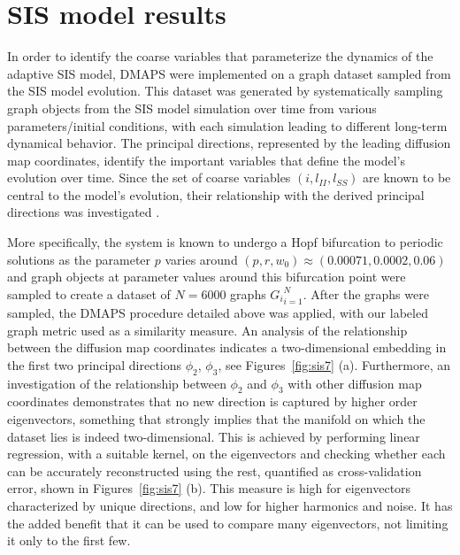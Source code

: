 \section{SIS model results}

In order to identify the coarse variables that parameterize the
dynamics of the adaptive SIS model, DMAPS were implemented on a graph
dataset sampled from the SIS model evolution. This dataset was
generated by systematically sampling graph objects from the SIS model
simulation over time from various parameters/initial conditions, with
each simulation leading to different long-term dynamical behavior. The
principal directions, represented by the leading diffusion map
coordinates, identify the important variables that define the model's
evolution over time. Since the set of coarse variables
$(i, l_{II}, l_{SS})$ are known to be central to the model's
evolution, their relationship with the derived principal directions
was investigated \cite{gross_robust_2008}.

More specifically, the system is known to undergo a Hopf bifurcation
to periodic solutions as the parameter $p$ varies around
$(p, r, w_0) \approx (0.00071, 0.0002, 0.06)$ and graph objects at
parameter values around this bifurcation point were sampled to create
a dataset of $N = 6000$ graphs ${G_i}_{i=1}^N$. After the graphs were
sampled, the DMAPS procedure detailed above was applied, with our
labeled graph metric used as a similarity measure. An analysis of the
relationship between the diffusion map coordinates indicates a
two-dimensional embedding in the first two principal directions
$\phi_2$, $\phi_3$, see Figures~\ref{fig:sis7} (a). Furthermore, an
investigation of the relationship between $\phi_2$ and $\phi_3$ with
other diffusion map coordinates demonstrates that no new direction is
captured by higher order eigenvectors, something that strongly implies
that the manifold on which the dataset lies is indeed
two-dimensional. This is achieved by performing linear regression,
with a suitable kernel, on the eigenvectors and checking whether each
can be accurately reconstructed using the rest, quantified as
cross-validation error, shown in Figures~\ref{fig:sis7} (b). This
measure is high for eigenvectors characterized by unique directions,
and low for higher harmonics and noise. It has the added benefit that
it can be used to compare many eigenvectors, not limiting it only to
the first few.

